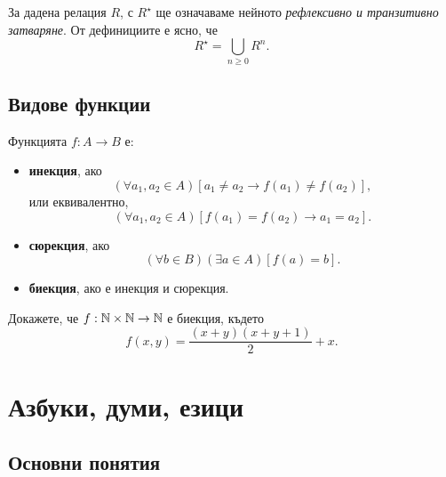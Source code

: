 За дадена релация $R$, с $R^\star$ ще означаваме нейното {\em рефлексивно и транзитивно затваряне}.
От дефинициите е ясно, че \[R^\star = \bigcup_{n\geq 0} R^n.\]

\subsection*{Видове функции}

Функцията $f:A \to B$ е:
\begin{itemize}
\item
  {\bf инекция}, ако 
  \[(\forall a_1,a_2\in A)[a_1\neq a_2 \rightarrow f(a_1)\neq f(a_2)],\]
  или еквивалентно,
  \[(\forall a_1,a_2\in A)[f(a_1) = f(a_2) \rightarrow a_1 = a_2].\]
\item
  {\bf сюрекция}, ако 
  \[(\forall b\in B)(\exists a\in A)[f(a) = b].\]
\item
  {\bf биекция}, ако е инекция и сюрекция.
\end{itemize}

\begin{problem}
  Докажете, че $f: \mathbb{N} \times \mathbb{N}\rightarrow \mathbb{N}$ е биекция, където
  \[f(x, y) = \frac{(x+y)(x+y+1)}{2} + x.\]
\end{problem}

\section{Азбуки, думи, езици}

\subsection*{Основни понятия}

